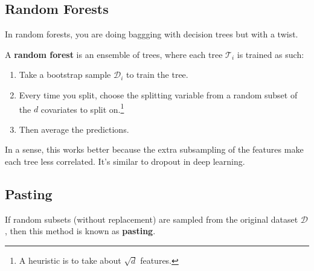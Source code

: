 \subsection{Random Forests} 

  In random forests, you are doing baggging with decision trees but with a twist. 

  \begin{definition}
    A \textbf{random forest} is an ensemble of trees, where each tree $\mathcal{T}_i$ is trained as such: 
    \begin{enumerate}
      \item Take a bootstrap sample $\mathcal{D}_i$ to train the tree. 
      \item Every time you split, choose the splitting variable from a random subset of the $d$ covariates to split on.\footnote{A heuristic is to take about $\sqrt{d}$ features.} 
      \item Then average the predictions. 
    \end{enumerate}
  \end{definition}

  In a sense, this works better because the extra subsampling of the features make each tree less correlated. It's similar to dropout in deep learning. 

\subsection{Pasting}

  \begin{definition}[Pasting]
    If random subsets (without replacement) are sampled from the original dataset $\mathcal{D}$, then this method is known as \textbf{pasting}. 
  \end{definition}

